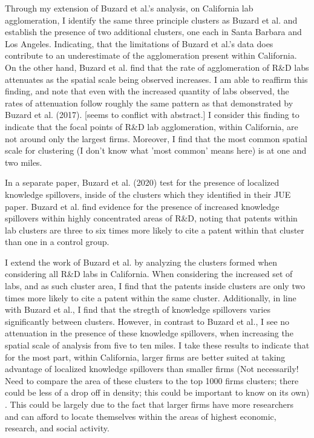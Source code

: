 \documentclass[12pt,letterpaper]{article}
\begin{document}
\par 
Through my extension of Buzard et al.'s analysis, on California lab agglomeration, I identify the same three principle clusters as Buzard et al. and establish the presence of two additional clusters, one each in Santa Barbara and Los Angeles. Indicating, that the limitations of Buzard et al.'s data does contribute to an underestimate of the agglomeration present within California. On the other hand, Buzard et al. find that the rate of agglomeration of R\&D labs attenuates as the spatial scale being observed increases. I am able to reaffirm this finding, and note that even with the increased quantity of labs observed, the rates of attenuation follow roughly the same pattern as that demonstrated by Buzard et al. (2017). [{\color{red}seems to conflict with abstract}.] I consider this finding to indicate that the focal points of R\&D lab agglomeration, within California, are not around only the largest firms. Moreover, I find that the most common spatial scale for clustering {\color{red}(I don't know what 'most common' means here)} is at one and two miles.  
\par
In a separate paper, Buzard et al. (2020) test for the presence of localized knowledge spillovers, inside of the clusters which they identified in their JUE paper. Buzard et al. find evidence for the presence of increased knowledge spillovers within highly concentrated areas of R\&D, noting that patents within lab clusters are three to six times more likely to cite a patent within that cluster than one in a control group. 
\par 
I extend the work of Buzard et al. by analyzing the clusters formed when considering all R\&D labs in California. When considering the increased set of labs, and as such cluster area, I find that the patents inside clusters are only two times more likely to cite a patent within the same cluster. Additionally, in line with Buzard et al., I find that the stregth of knowledge spillovers varies significantly between clusters. However, in contrast to Buzard et al., I see no attenuation in the presence of these knowledge spillovers, when increasing the spatial scale of analysis from five to ten miles. I take these results to indicate that for the most part, within California, larger firms are better suited at taking advantage of localized knowledge spillovers than smaller firms {\color{red}(Not necessarily! Need to compare the area of these clusters to the top 1000 firms clusters; there could be less of a drop off in density; this could be important to know on its own)} . This could be largely due to the fact that larger firms have more researchers and can afford to locate themselves within the areas of highest economic, research, and social activity.  
\end{document}
